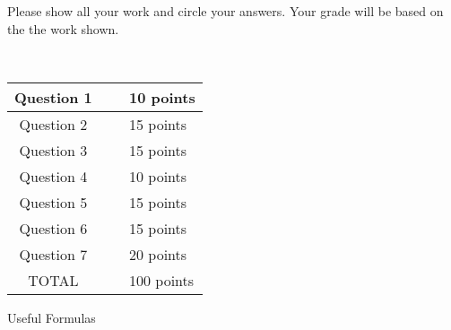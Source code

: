 Please show all your work and circle your answers.  Your grade 
will be based on the the work shown.  
{\large
\begin{center}
\mbox{ }
\vspace{.5in} \\
\begin{tabular}{|c|l|l|}
\hline \hline
\hspace{.05in} Question 1 \hspace{.05in} & \hspace{.5in} \mbox{ } & 10 points \\ \hline
\hspace{.05in} Question 2 \hspace{.05in} & \hspace{.5in} \mbox{ } & 15 points \\ \hline
\hspace{.05in} Question 3 \hspace{.05in} & \hspace{.5in} \mbox{ } & 15 points \\ \hline
\hspace{.05in} Question 4 \hspace{.05in} & \hspace{.5in} \mbox{ } & 10 points \\ \hline
\hspace{.05in} Question 5 \hspace{.05in} & \hspace{.5in} \mbox{ } & 15 points \\ \hline 
\hspace{.05in} Question 6 \hspace{.05in} & \hspace{.5in} \mbox{ } &15 points \\ \hline
\hspace{.05in} Question 7 \hspace{.05in} & \hspace{.5in} \mbox{ } &20 points \\ \hline

\hspace{.05in} TOTAL \hspace{.05in} & \hspace{1in} \mbox{ }  &100 points \\ \hline \hline
\end{tabular}
\end{center}
}

\newpage
\begin{center}
\begin{large}
Useful Formulas
\end{large}
\end{center}

